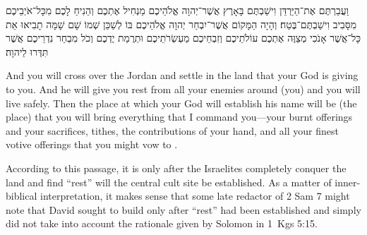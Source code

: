 \begin{hebrewtext}
    וַעֲבַרְתֶּם אֶת־הַיַּרְדֵּן וִישַׁבְתֶּם בָּאָרֶץ אֲשֶׁר־יְהוָה אֱלֹהֵיכֶם מַנְחִיל אֶתְכֶם וְהֵנִיחַ לָכֶם מִכָּל־אֹיְבֵיכֶם מִסָּבִיב וִישַׁבְתֶּם־בֶּטַח׃ 
    וְהָיָה הַמָּקוֹם אֲשֶׁר־יִבְחַר יְהוָה אֱלֹהֵיכֶם בּוֹ לְשַׁכֵּן שְׁמוֹ שָׁם שָׁמָּה תָבִיאוּ אֵת כָּל־אֲשֶׁר אָנֹכִי מְצַוֶּה אֶתְכֶם עוֹלֹתֵיכֶם וְזִבְחֵיכֶם מַעְשְׂרֹתֵיכֶם וּתְרֻמַת יֶדְכֶם וְכֹל מִבְחַר נִדְרֵיכֶם אֲשֶׁר תִּדְּרוּ לַיהוָה׃
\end{hebrewtext}
\begin{translation}
    And you will cross over the Jordan and settle in the land that \yahweh your God is giving to you. And he will give you rest from all your enemies around (you) and you will live safely.
    Then the place at which \yahweh your God will establish his name will be (the place) that you will bring everything that I command you---your burnt offerings and your sacrifices, tithes, the contributions of your hand, and all your finest votive offerings that you might vow to \yahweh.
\end{translation}
\noindent
According to this passage, it is only after the Israelites completely conquer the land and find ``rest'' will the central cult site be established.  As a matter of inner-biblical interpretation, it makes sense that some late redactor of 2 Sam 7 might note that David sought to build \thetemple only after ``rest'' had been established and simply did not take into account the rationale given by Solomon in 1~Kgs 5:15.

